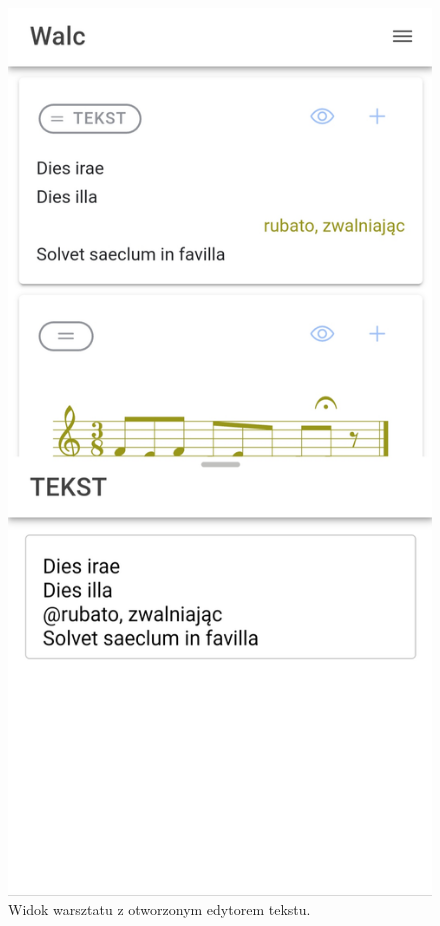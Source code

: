 \begin{figure}[H]
	\begin{center}
		\includegraphics[scale=0.13]{media/TextEditor.jpg}
	\end{center}
	\caption{Widok warsztatu z otworzonym edytorem tekstu.}
	\label{rys:workshop-view-with-editor}
\end{figure}

